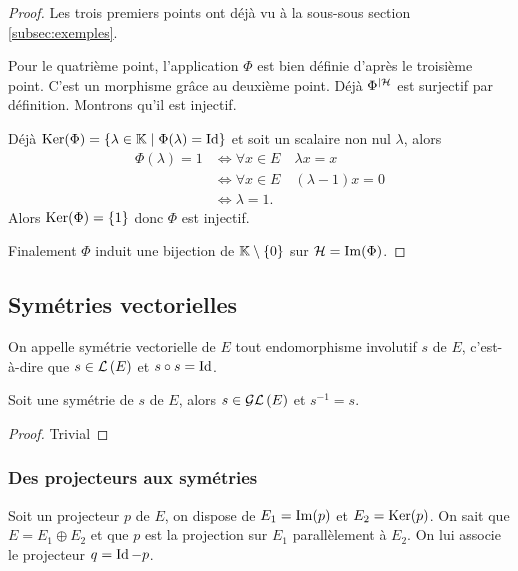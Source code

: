 \begin{proof}
  Les trois premiers points ont déjà vu à la sous-sous section~
\ref{subsec:exemples}.

  Pour le quatrième point, l'application \(\Phi\) est bien définie d'après le troisième point. C'est un morphisme grâce au deuxième point. Déjà \(\Phi^{|\mathcal{H}}\) est surjectif par définition. Montrons qu'il est injectif.

Déjà \(\operatorname{Ker}(\Phi)=\left\{\lambda \in \mathbb{K}\mathrel{}\middle|\mathrel{}\Phi(\lambda)=\operatorname{Id}\right\}\) et soit un scalaire non nul \(\lambda\), alors
\begin{align}
  \Phi(\lambda) = 1 &\iff \forall x \in E \quad \lambda x=x\\
  &\iff \forall x \in E \quad (\lambda-1)x=0\\
  &\iff \lambda=1.
\end{align}
Alors  \(\operatorname{Ker}(\Phi)=\{1\}\) donc \(\Phi\) est injectif.

Finalement \(\Phi\) induit une bijection de \(\mathbb{K}\setminus\{0\}\) sur \(\mathcal{H}=\operatorname{Im}(\Phi)\).
\end{proof}

\subsection{Symétries vectorielles}

\begin{defdef}
  On appelle symétrie vectorielle de \(E\) tout endomorphisme involutif \(s\) de \(E\), c'est-à-dire que \(s \in \mathcal{L}\left(E\right)\) et \(s \circ s = \operatorname{Id}\).
\end{defdef}

\begin{prop}
  Soit une symétrie de \(s\) de \(E\), alors \(s \in \mathcal{GL}\left(E\right)\) et \(s^{-1}=s\).
\end{prop}
\begin{proof}
  Trivial
\end{proof}

\subsubsection{Des projecteurs aux symétries}

Soit un projecteur \(p\) de \(E\), on dispose de \(E_1=\operatorname{Im}(p)\) et \(E_2=\operatorname{Ker}(p)\). On sait que \(E=E_1 \oplus E_2\) et que \(p\) est la projection sur \(E_1\) parallèlement à \(E_2\). On lui associe le projecteur \(q=\operatorname{Id}-p\).

